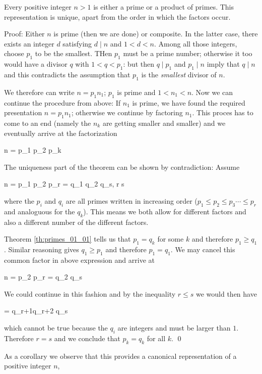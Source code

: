 \begin{theorem}
    Every positive integer $n > 1$ is either a prime or a product of primes. This representation is unique, apart from the order in which the factors occur.
\end{theorem}

Proof: Either $n$ is prime (then we are done) or composite. In the latter case, there exists an integer $d$ satisfying $d \mid n$ and $1 < d < n$. Among all those integers, choose $p_1$ to be the smallest. THen $p_1$ must be a prime number; otherwise it too would have a divisor $q$ with $1 < q < p_1$: but then $q \mid p_1$ and $p_1 \mid n$ imply that $q \mid n$ and this contradicts the assumption that $p_1$ is the \emph{smallest} divisor of $n$.

We therefore can write $n = p_1 n_1$; $p_1$ is prime and $1 < n_1 < n$. Now we can continue the procedure from above: If $n_1$ is prime, we have found the required presentation $n = p_1 n_1$; otherwise we continue by factoring $n_1$. This proces has to come to an end (namely the $n_k$ are getting smaller and smaller) and we eventually arrive at the factorization

\bee
n = p_1 p_2 \cdots p_k
\eee

The uniqueness part of the theorem can be shown by contradiction: Assume

\bee
n = p_1 p_2 \cdots p_r = q_1 q_2 \cdots q_s, \quad r \leq s
\eee

where the $p_i$ and $q_i$ are all primes written in increasing order ($p_1 \leq p_2 \leq p_3 \cdots \leq p_r$ and analoguous for the $q_k$). This means we both allow for different factors and also a different number of the different factors.

Theorem \ref{th:primes_01_01} tells us that $p_1 = q_k$ for some $k$ and therefore $p_1 \geq q_1$. Similar reasoning gives $q_1 \geq p_1$ and therefore $p_1 = q_1$. We may cancel this common factor in above expression and arrive at

\bee
n = p_2 \cdots p_r = q_2 \cdots q_s
\eee

We could continue in this fashion and by the inequality $r \leq s$ we would then have

 = q_{r+1}q_{r+2} \cdots q_s
\eee

which cannot be true because the $q_i$ are integers and must be larger than $1$. Therefore $r = s$ and we conclude that $p_k = q_k$ for all $k$. \qed

As a corollary we observe that this provides a canonical representation of a positive integer $n$,

